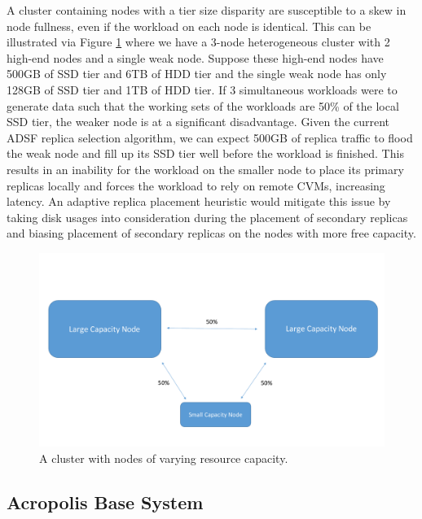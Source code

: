 \documentclass[12pt]{article}
\begin{document}
    A cluster containing nodes with a tier size disparity are susceptible to a
    skew in node fullness, even if the workload on each node is identical. This
    can be illustrated via Figure \ref{fig:tier_size_disparity} where we have a
    3-node heterogeneous cluster with 2 high-end nodes and a single weak node.
    Suppose these high-end nodes have 500GB of SSD tier and 6TB of HDD tier and
    the single weak node has only 128GB of SSD tier and 1TB of HDD tier. If 3
    simultaneous workloads were to generate data such that the working sets of
    the workloads are 50\% of the local SSD tier, the weaker node is at a
    significant disadvantage. Given the current ADSF replica selection
    algorithm, we can expect 500GB of replica traffic to flood the weak node
    and fill up its SSD tier well before the workload is finished. This results
    in an inability for the workload on the smaller node to place its primary
    replicas locally and forces the workload to rely on remote CVMs, increasing
    latency. An adaptive replica placement heuristic would mitigate this issue
    by taking disk usages into consideration during the placement of secondary
    replicas and biasing placement of secondary replicas on the nodes with more
    free capacity.

    \begin{figure}[h]
      \centering
      \includegraphics[scale=0.4]{images/homogeneous_tier_disparity.pdf} 
      \caption{A cluster with nodes of varying resource capacity.}
      \label{fig:tier_size_disparity}
    \end{figure}

  \subsection{Acropolis Base System}
\end{document}
